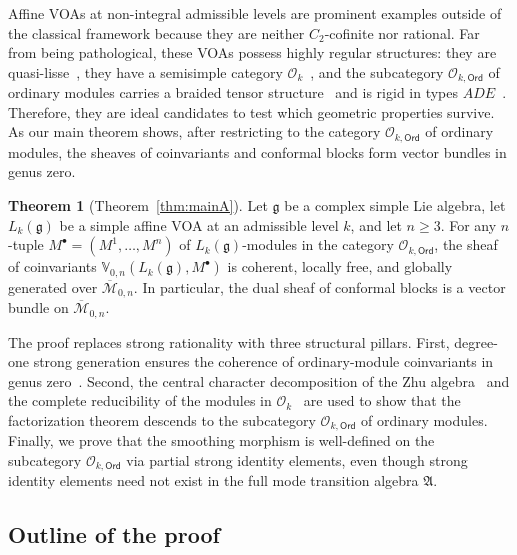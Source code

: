 \documentclass[12pt,a4paper,reqno]{amsart}
\numberwithin{equation}{section}
\theoremstyle{definition}
\newtheorem{thmalph}{Theorem}
\newcommand{\g}{\mathfrak{g}}
\newcommand{\M}{\mathcal{M}}
\def\O{\mathcal{O}}
\def\Ord{\mathsf{Ord}}
\def\fA{\mathfrak{A}}
\def\VV{\mathbb{V}}
\begin{document}
Affine VOAs at non-integral admissible levels are prominent examples outside of the classical framework because they are neither $C_2$-cofinite nor rational. Far from being pathological, these VOAs possess highly regular structures: they are quasi-lisse~\cite{A15, AvEM22}, they have a semisimple category $\O_k$~\cite{A16}, and the subcategory $\O_{k,\Ord}$ of ordinary modules carries a braided tensor structure~\cite{creutzig2018braided} and is rigid in types $ADE$~\cite{Creutzig19}. %
Therefore, they are ideal candidates to test which geometric properties survive. As our main theorem shows, after restricting to the category $\O_{k,\Ord}$ of ordinary modules, the sheaves of coinvariants and conformal blocks form vector bundles in genus zero.

\begin{thmalph}[Theorem~\ref{thm:mainA}]\label{thm:A}
Let $\g$ be a complex simple Lie algebra, let $L_k(\g)$ be a simple affine VOA at an admissible level $k$, and let $n\geq 3$. For any $n$-tuple $M^\bullet = (M^1,\dots, M^n)$ of $L_k(\g)$-modules in the category $\O_{k,\Ord}$, the sheaf of coinvariants $\VV_{0,n}(L_k(\g),M^\bullet)$ is coherent, locally free, and globally generated over $\overline{\M}_{0,n}$. In particular, the dual sheaf of conformal blocks is a vector bundle on $\overline{\M}_{0,n}$.
\end{thmalph}

The proof replaces strong rationality with three structural pillars. First, degree-one strong generation ensures the coherence of ordinary-module coinvariants in genus zero~\cite[Corollary A]{DG}. Second, the central character decomposition of the Zhu algebra~\cite[Theorem 3.4]{AvE} and the complete reducibility of the modules in $\O_k$~\cite[Main theorem]{A16} are used to show that the factorization theorem descends to the subcategory $\O_{k,\Ord}$ of ordinary modules. Finally, we prove that the smoothing morphism is well-defined on the subcategory $\O_{k,\Ord}$ via partial strong identity elements, even though strong identity elements need not exist in the full mode transition algebra $\fA$.

\subsection{Outline of the proof}
\end{document}
